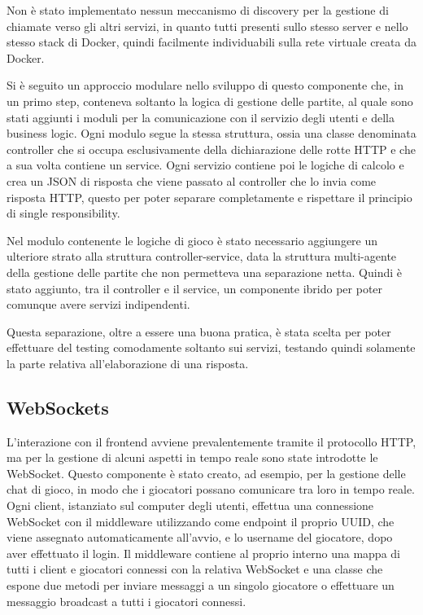 Non è stato implementato nessun meccanismo di discovery per la gestione di chiamate verso gli altri servizi, in quanto tutti presenti sullo stesso server e nello stesso stack di Docker, quindi facilmente individuabili sulla rete virtuale creata da Docker.

\vspace{1cm}

Si è seguito un approccio modulare nello sviluppo di questo componente che, in un primo step, conteneva soltanto la logica di gestione delle partite, al quale sono stati aggiunti i moduli per la comunicazione con il servizio degli utenti e della business logic. Ogni modulo segue la stessa struttura, ossia una classe denominata controller che si occupa esclusivamente della dichiarazione delle rotte HTTP e che a sua volta contiene un service. Ogni servizio contiene poi le logiche di calcolo e crea un JSON di risposta che viene passato al controller che lo invia come risposta HTTP, questo per poter separare completamente e rispettare il principio di single responsibility.

Nel modulo contenente le logiche di gioco è stato necessario aggiungere un ulteriore strato alla struttura controller-service, data la struttura multi-agente della gestione delle partite che non permetteva una separazione netta. Quindi è stato aggiunto, tra il controller e il service, un componente ibrido per poter comunque avere servizi indipendenti.

Questa separazione, oltre a essere una buona pratica, è stata scelta per poter effettuare del testing comodamente soltanto sui servizi, testando quindi solamente la parte relativa all'elaborazione di una risposta.

\subsection{WebSockets}

L'interazione con il frontend avviene prevalentemente tramite il protocollo HTTP, ma per la gestione di alcuni aspetti in tempo reale sono state introdotte le WebSocket.
Questo componente è stato creato, ad esempio, per la gestione delle chat di gioco, in modo che i giocatori possano comunicare tra loro in tempo reale. Ogni client, istanziato sul computer degli utenti, effettua una connessione WebSocket con il middleware utilizzando come endpoint il proprio UUID, che viene assegnato automaticamente all'avvio, e lo username del giocatore, dopo aver effettuato il login. Il middleware contiene al proprio interno una mappa di tutti i client e giocatori connessi con la relativa WebSocket e una classe che espone due metodi per inviare messaggi a un singolo giocatore o effettuare un messaggio broadcast a tutti i giocatori connessi.

